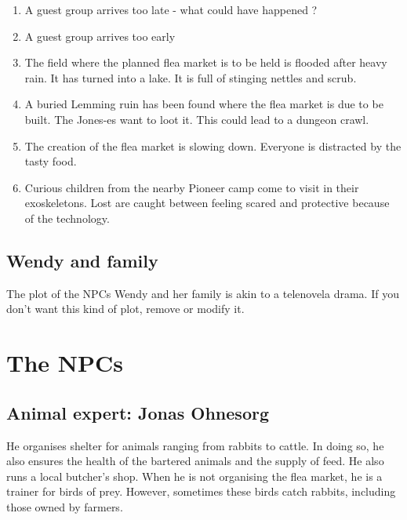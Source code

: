 \begin{enumerate}
\item A guest group arrives too late - what could have happened ?
\item A guest group arrives too early
\item The field where the planned flea market is to be held is flooded after heavy rain. It has turned into a lake. It is full of stinging nettles and scrub.
\item A buried Lemming ruin has been found where the flea market is due to be built. The Jones-es want to loot it. This could lead to a dungeon crawl.
\item The creation of the flea market is slowing down. Everyone is distracted by the tasty food.
\item Curious children from the nearby Pioneer camp come to visit in their exoskeletons. Lost are caught between feeling scared and protective because of the technology.
\end{enumerate}

\section{Wendy and family}

The plot of the NPCs Wendy and her family is akin to a telenovela drama. If you don't want this kind of plot, remove or modify it.

\chapter{The NPCs}

\section{Animal expert: Jonas Ohnesorg}

He organises shelter for animals ranging from rabbits to cattle. In doing so, he also ensures the health of the bartered animals and the supply of feed. He also runs a local butcher's shop. When he is not organising the flea market, he is a trainer for birds of prey. However, sometimes these birds catch rabbits, including those owned by farmers.


